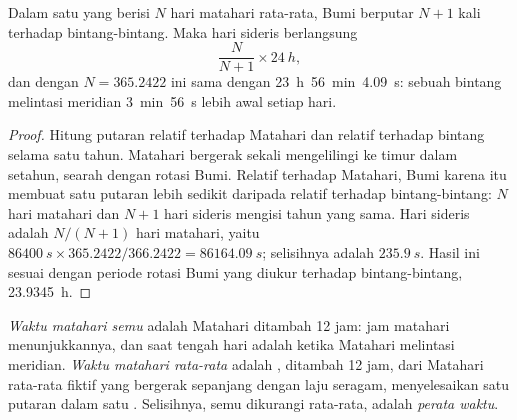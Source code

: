 \begin{proposition}\label{prop:b1:spherical-astronomy:sidereal-day}
Dalam satu  yang berisi $N$ hari matahari rata-rata, Bumi berputar $N + 1$ kali terhadap bintang-bintang. Maka hari sideris berlangsung
\[
  \frac{N}{N + 1}\times\qty{24}{h},
\]
dan dengan $N = 365.2422$ ini sama dengan \qty{23}{h}~\qty{56}{min}~\qty{4.09}{s}: sebuah bintang melintasi meridian \qty{3}{min}~\qty{56}{s}  lebih awal setiap hari.
\end{proposition}

\begin{proof}
Hitung putaran relatif terhadap Matahari dan relatif terhadap bintang selama satu tahun. Matahari bergerak sekali mengelilingi  ke timur dalam setahun, searah dengan rotasi Bumi. Relatif terhadap Matahari, Bumi karena itu membuat satu putaran lebih sedikit daripada relatif terhadap bintang-bintang: $N$ hari matahari dan $N + 1$ hari sideris mengisi tahun yang sama. Hari sideris adalah $N/(N+1)$ hari matahari, yaitu $\qty{86400}{s}\times 365.2422/366.2422 = \qty{86164.09}{s}$; selisihnya adalah $\qty{235.9}{s}$. Hasil ini sesuai dengan periode rotasi Bumi yang diukur terhadap bintang-bintang, \qty{23.9345}{h}.
\end{proof}

\begin{definition}\label{def:b1:spherical-astronomy:solar-time}
\emph{Waktu matahari semu} adalah  Matahari ditambah 12 jam: jam matahari menunjukkannya, dan saat tengah hari adalah ketika Matahari melintasi meridian. \emph{Waktu matahari rata-rata} adalah , ditambah 12 jam, dari Matahari rata-rata fiktif yang bergerak sepanjang  dengan laju seragam, menyelesaikan satu putaran dalam satu . Selisihnya, semu dikurangi rata-rata, adalah \emph{perata waktu}.
\end{definition}

